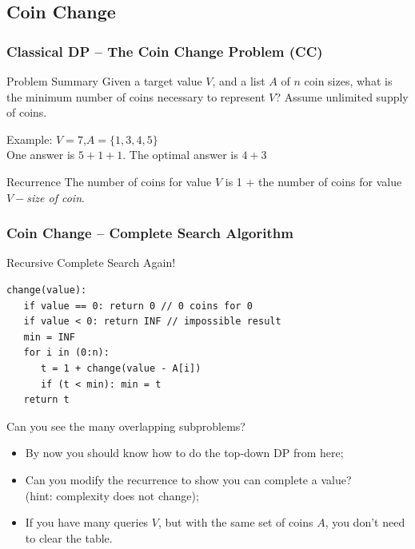 \documentclass{beamer}
\begin{document}
\subsection{Coin Change}
\begin{frame}
  \frametitle{Classical DP -- The Coin Change Problem (CC)}
  \begin{block}{Problem Summary}
    Given a target value $V$, and a list $A$ of $n$ coin sizes, what
    is the minimum number of coins necessary to represent $V$? Assume
    unlimited supply of coins.
  \end{block}

  Example: $V = 7$,$A = \{1,3,4,5\}$\\
  \medskip
  One answer is $5+1+1$. The optimal answer is $4+3$

  \bigskip

  \begin{exampleblock}{Recurrence}
    The number of coins for value $V$ is 1 + the number of coins for
    value $V - $\emph{size of coin}.
  \end{exampleblock}
\end{frame}

\begin{frame}
  \frametitle{Coin Change -- Complete Search Algorithm}
  {\smaller
  \begin{block}{Recursive Complete Search Again!}
\begin{verbatim}
change(value):
   if value == 0: return 0 // 0 coins for 0
   if value < 0: return INF // impossible result
   min = INF
   for i in (0:n):
      t = 1 + change(value - A[i])
      if (t < min): min = t
   return t
\end{verbatim}

\medskip

Can you see the many overlapping subproblems?
  \end{block}
\begin{itemize}
  \item By now you should know how to do the top-down DP from here;
  \item Can you modify the recurrence to show  you can complete a value?\\ 
    (hint: complexity does not change);
  \item If you have many queries $V$, but with the same set of coins
    $A$, you don't need to clear the table.
\end{itemize}


  }
\end{frame}
\end{document}

